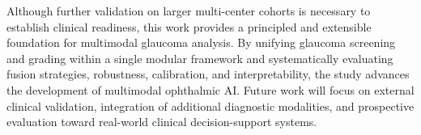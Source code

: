 \documentclass[preprint,12pt]{elsarticle}
\begin{document}
Although further validation on larger multi-center cohorts is necessary to establish clinical readiness, this work provides a principled and extensible foundation for multimodal glaucoma analysis. By unifying glaucoma screening and grading within a single modular framework and systematically evaluating fusion strategies, robustness, calibration, and interpretability, the study advances the development of multimodal ophthalmic AI. Future work will focus on external clinical validation, integration of additional diagnostic modalities, and prospective evaluation toward real-world clinical decision-support systems.










\end{document}
